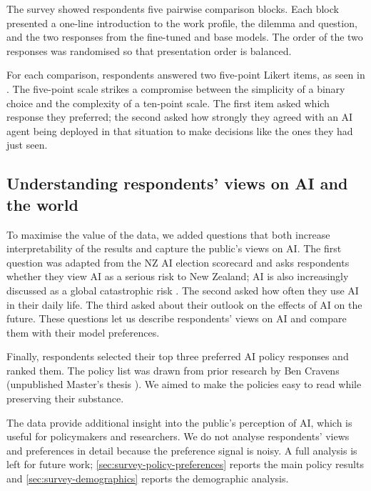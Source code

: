 The survey showed respondents five pairwise comparison blocks. Each block presented a one-line introduction to the work profile, the dilemma and question, and the two responses from the fine-tuned and base models. The order of the two responses was randomised so that presentation order is balanced.

For each comparison, respondents answered two five-point Likert items, as seen in . The five-point scale strikes a compromise between the simplicity of a binary choice and the complexity of a ten-point scale. The first item asked which response they preferred; the second asked how strongly they agreed with an AI agent being deployed in that situation to make decisions like the ones they had just seen.


\subsection{Understanding respondents' views on AI and the world}

To maximise the value of the data, we added questions that both increase interpretability of the results and capture the public's views on AI. The first question was adapted from the NZ AI election scorecard \cite{AIElectionScorecard} and asks respondents whether they view AI as a serious risk to New Zealand; AI is also increasingly discussed as a global catastrophic risk \cite{GlobalCatastrophicRisks,moonGlobalCatastrophicRisk2024}. The second asked how often they use AI in their daily life. The third asked about their outlook on the effects of AI on the future. These questions let us describe respondents' views on AI and compare them with their model preferences.

Finally, respondents selected their top three preferred AI policy responses and ranked them. The policy list was drawn from prior research by Ben Cravens (unpublished Master's thesis \cite{bencravensPreparingAdvancedArtificial}). We aimed to make the policies easy to read while preserving their substance. 

The data provide additional insight into the public's perception of AI, which is useful for policymakers and researchers. We do not analyse respondents' views and preferences in detail because the preference signal is noisy. A full analysis is left for future work; \ref{sec:survey-policy-preferences} reports the main policy results and \ref{sec:survey-demographics} reports the demographic analysis.



